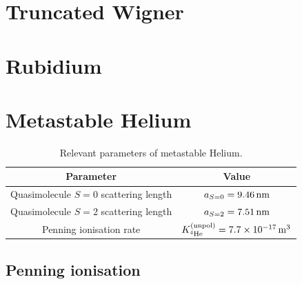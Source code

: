 \section{Truncated Wigner}
\label{BackgroundTheory:TruncatedWigner}
\section{Rubidium}
\label{BackgroundTheory:Rubidium}
\section{Metastable Helium}
\label{BackgroundTheory:Helium}

\begin{table}
    \centering
    \begin{tabular}{cc}
    \toprule
    Parameter & Value\\
    \midrule
    Quasimolecule $S=0$ scattering length & $a_{S=0}=\unit[9.46]{nm}$\\
    Quasimolecule $S=2$ scattering length & $a_{S=2}=\unit[7.51]{nm}$\\
    Penning ionisation rate & $K^\text{(unpol)}_{^4\text{He}} = \unit[7.7\times 10^{-17}]{m\textsuperscript{3}}$\\
    \bottomrule
    \end{tabular}
    \caption{\label{BackgroundTheory:He*Parameters} Relevant parameters of metastable Helium.}
\end{table}

\subsection{Penning ionisation}
\label{BackgroundTheory:PenningIonisation}

